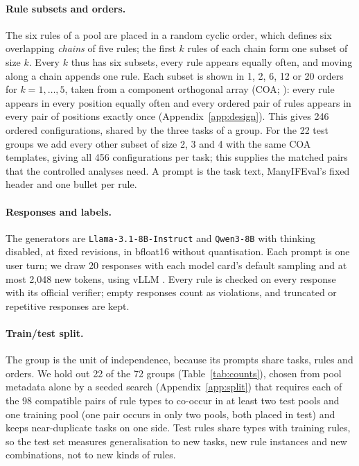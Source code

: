 \documentclass{article}
\begin{document}
\paragraph{Rule subsets and orders.} The six rules of a pool are placed in a random cyclic order, which defines six
overlapping \emph{chains} of five rules; the first $k$ rules of each chain form one subset of size $k$. Every $k$ thus
has six subsets, every rule appears equally often, and moving along a chain appends one rule. Each subset is shown
in 1, 2, 6, 12 or 20 orders for $k=1,\dots,5$, taken from a component orthogonal array (COA; \citealp{yang2021coa}):
every rule appears in every position equally often and every ordered pair of rules appears in every pair of positions
exactly once (Appendix~\ref{app:design}). This gives 246 ordered configurations, shared by the three tasks of a group.
For the 22 test groups we add every other subset of size 2, 3 and 4 with the same COA templates, giving all 456
configurations per task; this supplies the matched pairs that the controlled analyses need. A prompt is the task
text, ManyIFEval's fixed header and one bullet per rule.

\paragraph{Responses and labels.} The generators are \texttt{Llama-3.1-8B-Instruct} \citep{grattafiori2024llama3} and
\texttt{Qwen3-8B} \citep{yang2025qwen3} with thinking disabled, at fixed revisions, in bfloat16 without quantisation.
Each prompt is one user turn; we draw 20 responses with each model card's default sampling and at most 2,048 new
tokens, using vLLM \citep{kwon2023vllm}. Every rule is checked on
every response with its official verifier; empty responses count as violations, and truncated or repetitive responses
are kept.

\paragraph{Train/test split.} The group is the unit of independence, because its prompts share tasks, rules and
orders. We hold out 22 of the 72 groups (Table~\ref{tab:counts}), chosen from pool metadata alone by a seeded search
(Appendix~\ref{app:split}) that requires each of the 98 compatible pairs of rule types to co-occur in at least two test
pools and one training pool (one pair occurs in only two pools, both placed in test) and keeps near-duplicate tasks
on one side. Test rules share types with training rules, so the test set measures generalisation to new tasks, new
rule instances and new combinations, not to new kinds of rules.
\end{document}
